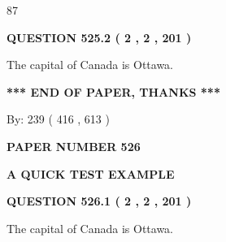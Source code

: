 \documentclass[12pt]{article}
\begin{document}
87
 
 
  
\vspace{0.2in}
  
{\textbf{\Large{QUESTION
525.2 
 ( 2 , 2 , 201 )
}}}
  
  
 
 
\noindent{}
 
 
The capital of Canada is Ottawa.
 
 
 
 
   
   
 \vspace{0.2in}
 
   
   
   
   
\vspace{1.0in} 
{\textbf{\large{ *** END OF PAPER, THANKS *** }}} 
   
   
\hspace{1.0in} By: 
 239 ( 416 ,  613 )
   
   
   
   
\newpage 
\setcounter{page}{ 
   526001 } 
   
   
   
   
 {\textbf{ \Large{ PAPER NUMBER  526  }}}
   
   
\vspace{0.2in}
   
   
   
   
   
   
 \vspace{0.2in}
{\LARGE {\textbf{ A QUICK TEST EXAMPLE}}}
   
   
  
\vspace{0.2in}
  
{\textbf{\Large{QUESTION
526.1 
 ( 2 , 2 , 201 )
}}}
  
  
 
 
\noindent{}
 
 
The capital of Canada is Ottawa.
 
 
 
 
  
\vspace{0.2in}
  
\end{document}

